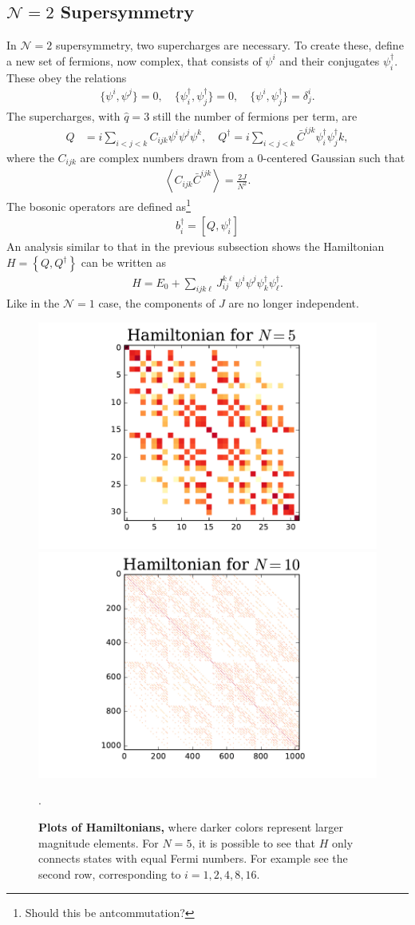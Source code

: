\documentclass[12pt]{article} %
\renewcommand{\cal}{\mathcal}
\newcommand{\ex}[1]{\left\langle #1 \right\rangle}
\renewcommand{\l}{\ell}
\newcommand{\comm}[2]{\left[#1,#2\right]}
\newcommand{\acom}[2]{\left\{#1,#2\right\}}
\begin{document}
\subsection{$\cal{N}=2$ Supersymmetry}\emph{} \label{sub:N2susy}

In $\cal N=2$ supersymmetry, two supercharges are necessary. To create these, define a new set of fermions, now complex, that consists of $\psi^i$ and their conjugates $\psi^\dag_i$. These obey the relations 
\begin{align}
\{\psi^i,\psi^j\} = 0, \quad \{\psi^\dag_i,\psi^\dag_j\} = 0, \quad
	\{\psi^i,\psi^\dag_j\} = \delta_j^i. \label{eqn:N2_ant}
\end{align}
The supercharges, with $\hat{q}=3$ still the number of fermions per term, are
\begin{align}
Q &= i\sum_{i<j<k}C_{ijk}\psi^i\psi^j\psi^k,\quad
Q^\dag = i\sum_{i<j<k}\bar C^{ijk}\psi^\dag_i\psi^\dag_jk,
	\label{eqn:N2charge}
\end{align}
where the $C_{ijk}$ are complex numbers drawn from a 0-centered Gaussian such that
\begin{align}
\ex{C_{ijk}\bar C^{ijk}} = \frac{2J}{N^2}.
\end{align} 
The bosonic operators are defined as\footnote{Should this be antcommutation?}
\begin{align}
b^\dag_i = \comm{Q}{\psi^\dag_i}
\end{align}
An analysis similar to that in the previous subsection shows the Hamiltonian $H = \acom{Q}{Q^\dag}$ can be written as
\begin{align}
H = E_0 + \sum_{ijk\l}J_{ij}^{k\l}\psi^i\psi^j\psi^\dag_k\psi^\dag_\l.
\end{align}
Like in the $\cal N=1$ case, the components of $J$ are no longer independent.
\begin{figure}
	\centering
	\includegraphics[width=.49\textwidth]{hamil5}
	\includegraphics[width=.49\textwidth]{hamil10}
	\caption{\textbf{Plots of Hamiltonians,} where darker colors represent larger magnitude elements. For $N=5$, it is possible to see that $H$ only connects states with equal Fermi numbers. For example see the second row, corresponding to $i=1,2,4,8,16$. }
	\label{fig:hamplot}.
\end{figure}
\end{document}
